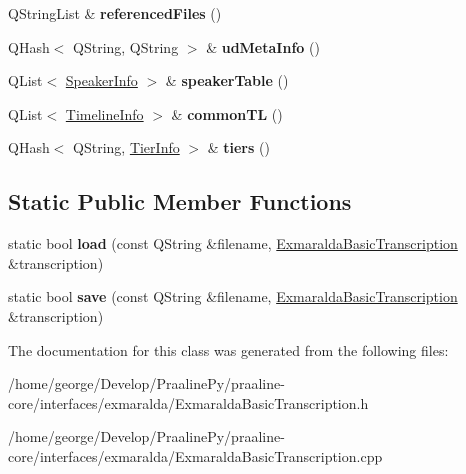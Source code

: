 \begin{DoxyCompactItemize}
Q\+String\+List \& {\bfseries referenced\+Files} ()
\item 
\mbox{\label{class_exmaralda_basic_transcription_a467c002a9c90df5fa54aaa3765bd6e57}} 
Q\+Hash$<$ Q\+String, Q\+String $>$ \& {\bfseries ud\+Meta\+Info} ()
\item 
\mbox{\label{class_exmaralda_basic_transcription_adf5df9b5e145617423ffba3aba3e00f1}} 
Q\+List$<$ \hyperlink{class_exmaralda_basic_transcription_1_1_speaker_info}{Speaker\+Info} $>$ \& {\bfseries speaker\+Table} ()
\item 
\mbox{\label{class_exmaralda_basic_transcription_ae53576dad124a6e0857e5bbc78f70b4a}} 
Q\+List$<$ \hyperlink{class_exmaralda_basic_transcription_1_1_timeline_info}{Timeline\+Info} $>$ \& {\bfseries common\+TL} ()
\item 
\mbox{\label{class_exmaralda_basic_transcription_a4994d4e28a6fc109d84d36b7e97da4dd}} 
Q\+Hash$<$ Q\+String, \hyperlink{class_exmaralda_basic_transcription_1_1_tier_info}{Tier\+Info} $>$ \& {\bfseries tiers} ()
\end{DoxyCompactItemize}
\subsection*{Static Public Member Functions}
\begin{DoxyCompactItemize}
\item 
\mbox{\label{class_exmaralda_basic_transcription_a36bc1e35ef4eee398b062ffc05ca54e9}} 
static bool {\bfseries load} (const Q\+String \&filename, \hyperlink{class_exmaralda_basic_transcription}{Exmaralda\+Basic\+Transcription} \&transcription)
\item 
\mbox{\label{class_exmaralda_basic_transcription_a456e04788999b47a554ba30f105e919c}} 
static bool {\bfseries save} (const Q\+String \&filename, \hyperlink{class_exmaralda_basic_transcription}{Exmaralda\+Basic\+Transcription} \&transcription)
\end{DoxyCompactItemize}


The documentation for this class was generated from the following files\+:\begin{DoxyCompactItemize}
\item 
/home/george/\+Develop/\+Praaline\+Py/praaline-\/core/interfaces/exmaralda/Exmaralda\+Basic\+Transcription.\+h\item 
/home/george/\+Develop/\+Praaline\+Py/praaline-\/core/interfaces/exmaralda/Exmaralda\+Basic\+Transcription.\+cpp\end{DoxyCompactItemize}
